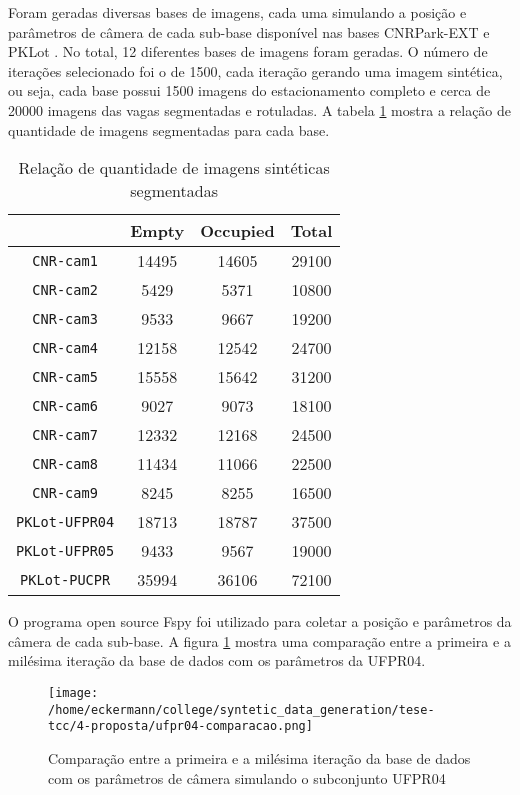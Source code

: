 Foram geradas diversas bases de imagens, cada uma simulando a posição e parâmetros de câmera de cada sub-base disponível nas bases CNRPark-EXT \citet{cnrpark} e PKLot \citep{pklot2}. No total, 12 diferentes bases de imagens foram geradas. O número de iterações selecionado foi o de 1500, cada iteração gerando uma imagem sintética, ou seja, cada base possui 1500 imagens do estacionamento completo e cerca de 20000 imagens das vagas segmentadas e rotuladas. A tabela \ref{tab:tabela-quantidades} mostra a relação de quantidade de imagens segmentadas para cada base.

\begin{table}[!htp]
    \centering
    \caption{Relação de quantidade de imagens sintéticas segmentadas}
    \label{tab:tabela-quantidades}
    \begin{tabular}{|c|ccc|}
    \cline{2-4}
    \multicolumn{1}{c|}{}& Empty & Occupied & Total \\
    \hline
    \texttt{CNR-cam1} & 14495 & 14605 & 29100 \\
    \hline
    \texttt{CNR-cam2} & 5429 & 5371 & 10800 \\
    \hline
    \texttt{CNR-cam3} & 9533 & 9667 & 19200 \\
    \hline
    \texttt{CNR-cam4} & 12158 & 12542 & 24700 \\
    \hline
    \texttt{CNR-cam5} & 15558 & 15642 & 31200 \\
    \hline
    \texttt{CNR-cam6} & 9027 & 9073 & 18100 \\
    \hline
    \texttt{CNR-cam7} & 12332 & 12168 & 24500 \\
    \hline
    \texttt{CNR-cam8} & 11434 & 11066 & 22500 \\
    \hline
    \texttt{CNR-cam9} & 8245 & 8255 & 16500 \\
    \hline
    \texttt{PKLot-UFPR04} & 18713 & 18787 & 37500 \\
    \hline
    \texttt{PKLot-UFPR05} & 9433 & 9567 & 19000 \\
    \hline
    \texttt{PKLot-PUCPR} & 35994 & 36106 & 72100 \\
    \hline
    \end{tabular}
\end{table}

O programa open source Fspy \citep{fspy} foi utilizado para coletar a posição e parâmetros da câmera de cada sub-base. A  figura \ref{fig:comparacao-ufpr04} mostra uma comparação entre a primeira e a milésima iteração da base de dados com os parâmetros da UFPR04.
\begin{figure}[!htb]
    \centering
    \texttt{[image: /home/eckermann/college/syntetic\_data\_generation/tese-tcc/4-proposta/ufpr04-comparacao.png]}
    \caption{Comparação entre a primeira e a milésima iteração da base de dados com os parâmetros de câmera simulando o subconjunto UFPR04}
    \label{fig:comparacao-ufpr04}
\end{figure}

